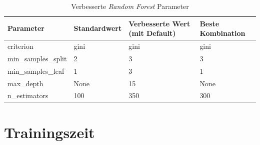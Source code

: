 \begin{table}[htbp]
  \centering
  \caption{Verbesserte \textit{Random Forest} Parameter}
  \label{tab:rf_best_std_parameter}
  \begin{tabular}{|l|l|l|l|}
  \hline
  Parameter & Standardwert & Verbesserte Wert (mit Default) & Beste Kombination \\
  \hline
  criterion & gini & gini & gini \\
  min\_samples\_split & 2 & 3 & 3 \\
  min\_samples\_leaf & 1 & 3 & 1 \\
  max\_depth & None & 15 & None \\
  n\_estimators & 100 & 350 & 300 \\
  \hline
  \end{tabular}
\end{table}

\section{Trainingszeit}

